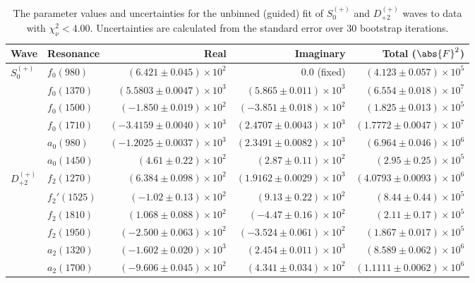 \begin{table}[ht]
    \begin{center}
        \begin{tabular}{llrrr}\toprule
        Wave & Resonance & Real & Imaginary & Total ($\abs{F}^2$) \\\midrule
$S_{0}^{(+)}$ & $f_{0}(980)$ & $(6.421 \pm 0.045) \times 10^{2}$ & $0.0$ (fixed) & $(4.123 \pm 0.057) \times 10^{5}$ \\
 & $f_{0}(1370)$ & $(5.5803 \pm 0.0047) \times 10^{3}$ & $(5.865 \pm 0.011) \times 10^{3}$ & $(6.554 \pm 0.018) \times 10^{7}$ \\
 & $f_{0}(1500)$ & $(-1.850 \pm 0.019) \times 10^{2}$ & $(-3.851 \pm 0.018) \times 10^{2}$ & $(1.825 \pm 0.013) \times 10^{5}$ \\
 & $f_{0}(1710)$ & $(-3.4159 \pm 0.0040) \times 10^{3}$ & $(2.4707 \pm 0.0043) \times 10^{3}$ & $(1.7772 \pm 0.0047) \times 10^{7}$ \\
 & $a_{0}(980)$ & $(-1.2025 \pm 0.0037) \times 10^{3}$ & $(2.3491 \pm 0.0082) \times 10^{3}$ & $(6.964 \pm 0.046) \times 10^{6}$ \\
 & $a_{0}(1450)$ & $(4.61 \pm 0.22) \times 10^{2}$ & $(2.87 \pm 0.11) \times 10^{2}$ & $(2.95 \pm 0.25) \times 10^{5}$ \\
$D_{+2}^{(+)}$ & $f_{2}(1270)$ & $(6.384 \pm 0.098) \times 10^{2}$ & $(1.9162 \pm 0.0029) \times 10^{3}$ & $(4.0793 \pm 0.0093) \times 10^{6}$ \\
 & $f_{2}'(1525)$ & $(-1.02 \pm 0.13) \times 10^{2}$ & $(9.13 \pm 0.22) \times 10^{2}$ & $(8.44 \pm 0.44) \times 10^{5}$ \\
 & $f_{2}(1810)$ & $(1.068 \pm 0.088) \times 10^{2}$ & $(-4.47 \pm 0.16) \times 10^{2}$ & $(2.11 \pm 0.17) \times 10^{5}$ \\
 & $f_{2}(1950)$ & $(-2.500 \pm 0.063) \times 10^{2}$ & $(-3.524 \pm 0.061) \times 10^{2}$ & $(1.867 \pm 0.017) \times 10^{5}$ \\
 & $a_{2}(1320)$ & $(-1.602 \pm 0.020) \times 10^{3}$ & $(2.454 \pm 0.011) \times 10^{3}$ & $(8.589 \pm 0.062) \times 10^{6}$ \\
 & $a_{2}(1700)$ & $(-9.606 \pm 0.045) \times 10^{2}$ & $(4.341 \pm 0.034) \times 10^{2}$ & $(1.1111 \pm 0.0062) \times 10^{6}$ \\\bottomrule
        \end{tabular}
    \caption{The parameter values and uncertainties for the unbinned (guided) fit of $S_{0}^{(+)}$ and $D_{+2}^{(+)}$ waves to data with $\chi^2_\nu < 4.00$. Uncertainties are calculated from the standard error over $30$ bootstrap iterations.}\label{tab:unbinned-fit-chisqdof-4.0-guided-Sp0p-Dp2p}
    \end{center}
\end{table}
